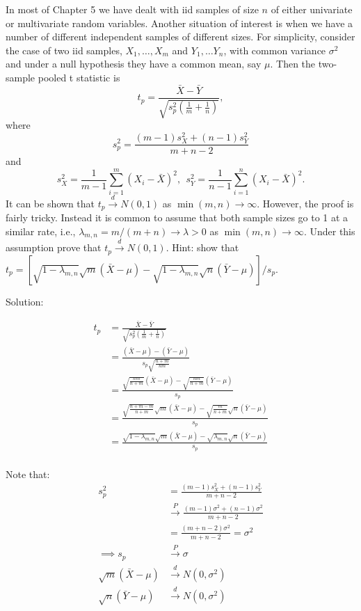 \documentclass[
  letterpaper,
  DIV=11,
  numbers=noendperiod]{scrreprt}
\begin{document}
In most of Chapter 5 we have dealt with iid samples of size \(n\) of
either univariate or multivariate random variables. Another situation of
interest is when we have a number of different independent samples of
different sizes. For simplicity, consider the case of two iid samples,
\(X_1, \dots, X_m\) and \(Y_1, \dots Y_n\), with common variance
\(\sigma^2\) and under a null hypothesis they have a common mean, say
\(\mu\). Then the two-sample pooled t statistic is
\[t_p = \frac{\bar X- \bar Y}{\sqrt{s_p^2(\frac{1}{m}+ \frac 1 n)}},\]
where \[s_p^2= \frac{(m-1)s_X^2 +(n-1)s_Y^2}{m+n-2}\] and
\[s_X^2 = \frac{1}{m-1} \sum_{i=1}^m (X_i-\bar X)^2,~~s_Y^2 = \frac{1}{n-1} \sum_{i=1}^n (X_i-\bar X)^2.\]
It can be shown that \(t_p \overset d \to N(0,1)\) as
\(\min(m,n) \to \infty\). However, the proof is fairly tricky. Instead
it is common to assume that both sample sizes go to 1 at a similar rate,
i.e., \(\lambda_{m,n} = m/(m+n) \to \lambda >0\) as
\(\min(m,n) \to \infty\). Under this assumption prove that
\(t_p \overset d \to N(0,1)\). Hint: show that
\(t_p = \left[\sqrt{1- \lambda_{m,n}}\sqrt m (\bar X-\mu)- \sqrt{1- \lambda_{m,n}}\sqrt n (\bar Y-\mu) \right]/s_p\).

Solution:

\[\begin{aligned}
t_p &= \frac{\bar X- \bar Y}{\sqrt{s_p^2(\frac{1}{m}+ \frac 1 n)}} \\
&= \frac{(\bar X - \mu)- (\bar Y-\mu)}{s_p\sqrt{\frac{n+m}{nm}}} \\
&= \frac{\sqrt{\frac{nm}{n+m}}(\bar X - \mu)- \sqrt{\frac{nm}{n+m}}(\bar Y-\mu)}{s_p} \\
&= \frac{\sqrt{\frac{n+m-m}{n+m}} \sqrt m(\bar X - \mu)- \sqrt{\frac{m}{n+m}}\sqrt n(\bar Y-\mu)}{s_p} \\
&= \frac{\sqrt{1-\lambda_{m,n}} \sqrt m(\bar X - \mu)- \sqrt{\lambda_{m,n}}\sqrt n(\bar Y-\mu)}{s_p} \\ 
\end{aligned}\]

Note that: \[\begin{aligned}
s_p^2 &= \frac{(m-1)s_X^2 +(n-1)s_Y^2}{m+n-2} \\
&\overset P \to \frac{(m-1)\sigma^2 +(n-1)\sigma^2}{m+n-2} \\
&= \frac{(m+n-2)\sigma^2}{m+n-2} = \sigma^2 \\
\implies s_p &\overset P \to \sigma \\
\sqrt m(\bar X - \mu) &\overset d \to N(0,\sigma^2) \\
\sqrt n(\bar Y - \mu) &\overset d \to N(0,\sigma^2)
\end{aligned}\]
\end{document}
